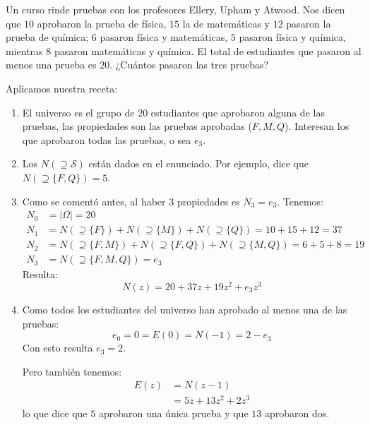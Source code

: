
  \begin{example}
    Un curso rinde pruebas
    con los profesores Ellery, Upham y Atwood.
    Nos dicen que \(10\) aprobaron la prueba de física,
    \(15\) la de matemáticas y
    \(12\) pasaron la prueba de química;
    \(6\) pasaron física y matemáticas,
    \(5\) pasaron física y química,
    mientras \(8\) pasaron matemáticas y química.
    El total de estudiantes
    que pasaron al menos una prueba es \(20\).
    ¿Cuántos pasaron las tres pruebas?

    Aplicamos nuestra receta:
    \begin{enumerate}
    \item
      El universo es el grupo de \(20\) estudiantes
      que aprobaron alguna de las pruebas,
      las propiedades son las pruebas aprobadas (\(F, M, Q\)).
      Interesan los que aprobaron todas las pruebas,
      o sea \(e_3\).
    \item
      Los \(N(\supseteq \mathcal{S})\) están dados
      en el enunciado.
      Por ejemplo,
      dice que \(N(\supseteq \{F, Q\}) = 5\).
    \item
      Como se comentó antes,
      al haber \(3\) propiedades es \(N_3 = e_3\).
      Tenemos:
      \begin{align*}
	N_0
	  &= \lvert \Omega \rvert = 20 \\
	N_1
	  &= N(\supseteq \{F\})
	       + N(\supseteq \{M\})
	       + N(\supseteq \{Q\})
	   = 10 + 15 + 12
	   = 37 \\
	N_2
	  &= N(\supseteq \{F, M\})
	       + N(\supseteq \{F, Q\})
	       + N(\supseteq \{M, Q\})
	   = 6 + 5 + 8
	   = 19 \\
	N_3
	  &= N(\supseteq \{F, M, Q\})
	   = e_3
      \end{align*}
      Resulta:
      \begin{equation*}
	N(z) = 20 + 37 z + 19 z^2 + e_3 z^3
      \end{equation*}
    \item
      Como todos los estudiantes del universo
      han aprobado al menos una de las pruebas:
      \begin{equation*}
	e_0 = 0 = E(0) = N(-1) = 2 - e_3
      \end{equation*}
      Con esto resulta \(e_3 = 2\).

      Pero también tenemos:
      \begin{align*}
	E(z)
	  &= N(z - 1) \\
	  &= 5 z + 13 z^2 + 2 z^3
      \end{align*}
      lo que dice que \(5\) aprobaron una única prueba
      y que \(13\) aprobaron dos.
    \end{enumerate}
  \end{example}

